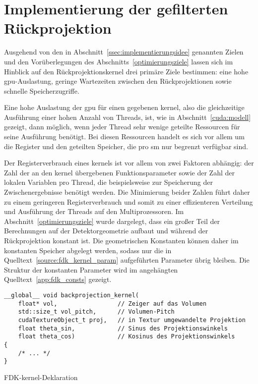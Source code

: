 \section{Implementierung der gefilterten Rückprojektion}

Ausgehend von den in Abschnitt~\ref{ssec:implementierungsidee} genannten Zielen und den Vorüberlegungen des
Abschnitts~\ref{optimierungsziele} lassen sich im Hinblick auf den Rückprojektionskernel drei primäre Ziele bestimmen:
eine hohe \gls{gpu}-Auslastung, geringe Wartezeiten zwischen den Rückprojektionen sowie schnelle Speicherzugriffe.

Eine hohe Auslastung der \gls{gpu} für einen gegebenen \gls{kernel}, also die gleichzeitige Ausführung einer hohen
Anzahl von Threads, ist, wie in Abschnitt~\ref{cuda:modell} gezeigt, dann möglich, wenn jeder Thread sehr wenige
geteilte Ressourcen für seine Ausführung benötigt. Bei diesen Ressourcen handelt es sich vor allem um die Register und
den geteilten Speicher, die pro \gls{sm} nur begrenzt verfügbar sind.

Der Registerverbrauch eines \gls{kernel}s ist vor allem von zwei Faktoren abhängig: der Zahl der an den \gls{kernel}
übergebenen Funktionsparameter sowie der Zahl der lokalen Variablen pro Thread, die beispielsweise zur Speicherung der
Zwischenergebnisse benötigt werden. Die Minimierung beider Zahlen führt daher zu einem geringeren Registerverbrauch und
somit zu einer effizienteren Verteilung und Ausführung der Threads auf den Multiprozessoren. Im
Abschnitt~\ref{optimierungsziele} wurde dargelegt, dass ein großer Teil der Berechnungen auf der Detektorgeometrie
aufbaut und während der Rückprojektion konstant ist. Die geometrischen Konstanten können daher im konstanten Speicher
abgelegt werden, sodass nur die in Quelltext~\ref{source:fdk_kernel_param} aufgeführten Parameter übrig bleiben. Die
Struktur der konstanten Parameter wird im angehängten Quelltext~\ref{app:fdk_consts} gezeigt.

\begin{listing}
\begin{verbatim}
__global__ void backprojection_kernel(
    float* vol,                 // Zeiger auf das Volumen
    std::size_t vol_pitch,      // Volumen-Pitch
    cudaTextureObject_t proj,   // in Textur umgewandelte Projektion
    float theta_sin,            // Sinus des Projektionswinkels
    float theta_cos)            // Kosinus des Projektionswinkels
{
    /* ... */
}
\end{verbatim}
\caption{FDK-\gls{kernel}-Deklaration}
\label{source:fdk_kernel_param}
\end{listing}

